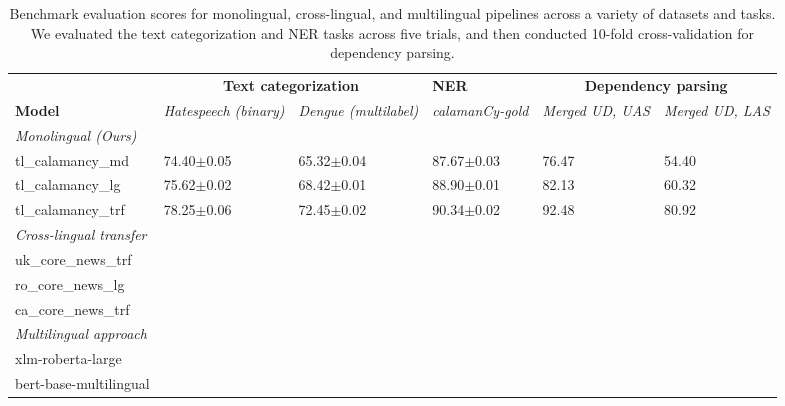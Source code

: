 \documentclass[../emnlp2023.tex]{subfiles}
\begin{document}
\begin{table*}[t]
\begin{tabular}{@{}p{4cm}p{2cm}p{2cm}p{2cm}p{2cm}p{2cm}@{}}
\toprule
                           & \multicolumn{2}{c}{\textbf{Text categorization}} & \textbf{NER} & \multicolumn{2}{c}{\textbf{Dependency parsing}}                         \\ 
\textbf{Model}             & \textit{Hatespeech (binary)} & \textit{Dengue (multilabel)} & \textit{calamanCy-gold} & \textit{Merged UD, UAS} & \textit{Merged UD, LAS} \\ \midrule 
\textit{Monolingual (Ours)}              \\
tl\_calamancy\_md   & 74.40$\pm$0.05 & 65.32$\pm$0.04 & 87.67$\pm$0.03 & 76.47 & 54.40\\
tl\_calamancy\_lg   & 75.62$\pm$0.02 & 68.42$\pm$0.01 & 88.90$\pm$0.01 & 82.13 & 60.32\\
tl\_calamancy\_trf  & 78.25$\pm$0.06 & 72.45$\pm$0.02 & 90.34$\pm$0.02 & 92.48 & 80.92\\ \midrule
\textit{Cross-lingual transfer} \\
uk\_core\_news\_trf & \\
ro\_core\_news\_lg & \\
ca\_core\_news\_trf & \\ \midrule
\textit{Multilingual approach} \\
xlm-roberta-large \\
bert-base-multilingual \\
\bottomrule
\end{tabular}
\caption{
    Benchmark evaluation scores for monolingual, cross-lingual, and multilingual pipelines across a variety of datasets and tasks.
    We evaluated the text categorization and NER tasks across five trials, and then conducted 10-fold cross-validation for dependency parsing.
}
\label{table:results}
\end{table*}
\end{document}
